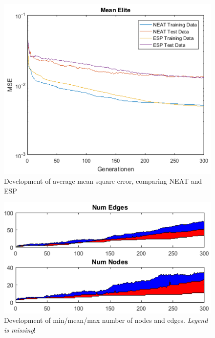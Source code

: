\documentclass{hbrs-ecta-report}
\begin{document}
\begin{figure}[ht!]
\centering
\includegraphics[width=\linewidth]{img/1.png}
\caption{Development of average mean square error, comparing NEAT and ESP}
\label{fig:1} 
\end{figure}
 
\begin{figure}[ht!]
\centering
\includegraphics[width=\linewidth]{img/2.png}
\caption{Development of min/mean/max number of nodes and edges. \textit{Legend is missing}!}
\label{fig:2} 
\end{figure}
\end{document}
